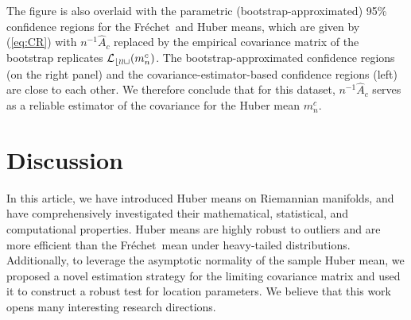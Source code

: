 \documentclass[preprint]{imsart}
\newcommand{\bbR}{\mathbb{R}}
\def\Frechet{Fr\'{e}chet}
\theoremstyle{plain}
\theoremstyle{remark}
\begin{document}
The figure is also overlaid with the parametric (bootstrap-approximated) 95\% confidence regions for the \Frechet\ and Huber means, which are given by (\ref{eq:CR}) with $n^{-1}\hat{A}_c$ replaced by the empirical covariance matrix of the bootstrap replicates $\mathcal{L_{\rm boot}}(m_n^c)$. %
The bootstrap-approximated confidence regions (on the right panel) and the covariance-estimator-based confidence regions (left) are close to each other. We therefore conclude that for this dataset, $n^{-1}\hat{A}_c$ serves as a reliable estimator of the covariance for the Huber mean $m_n^c$.
 
  

\section{Discussion}\label{sec:discuss}













In this article, we have introduced Huber means on Riemannian manifolds, and have comprehensively investigated their mathematical, statistical, and computational properties. Huber means are highly robust to outliers and are more efficient than the \Frechet\ mean under heavy-tailed distributions. Additionally, to leverage the asymptotic normality of the sample Huber mean, we proposed a novel estimation strategy for the limiting covariance matrix and used it to construct a robust test for location parameters. We believe that this work opens many interesting research directions.
\end{document}
